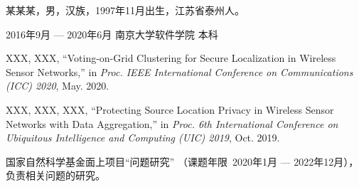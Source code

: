 \documentclass[winfonts,master,twoside,AutoFakeBold= {2}]{njuthesis}
\begin{document}
\backmatter
\begin{resume}
\begin{authorinfo}
\noindent 某某某，男，汉族，1997年11月出生，江苏省泰州人。
\end{authorinfo}
\begin{education}
\item[2016年9月 --- 2020年6月] 南京大学软件学院 \hfill 本科
\end{education}
\begin{publications}
\item XXX, XXX, “Voting-on-Grid Clustering for Secure
  Localization in Wireless Sensor Networks,” in \textsl{Proc. IEEE International
    Conference on Communications (ICC) 2020}, May. 2020.
\item XXX, XXX, XXX, “Protecting Source Location Privacy
  in Wireless Sensor Networks with Data Aggregation,” in \textsl{Proc. 6th
    International Conference on Ubiquitous Intelligence and Computing (UIC)
    2019}, Oct. 2019.
\end{publications}
\begin{projects}
\item 国家自然科学基金面上项目“问题研究”
（课题年限~2020年1月 --- 2022年12月），负责相关问题的研究。
\end{projects}
\end{resume}


\end{document}
